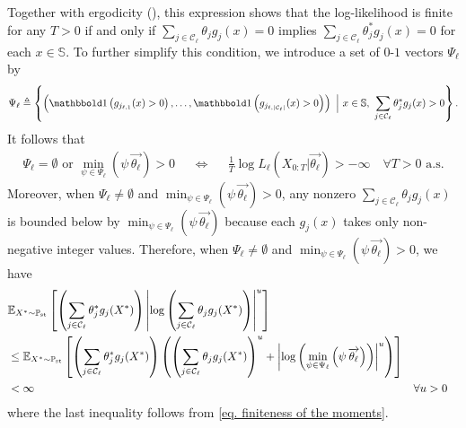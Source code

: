 \documentclass[pdflatex,sn-mathphys-num]{sn-jnl}%
\theoremstyle{thmstyleone}%
\theoremstyle{thmstyletwo}%
\theoremstyle{thmstylethree}%
\begin{document}
\begin{appendices}
Together with ergodicity (), this expression shows that the log-likelihood is finite for any $T>0$ if and only if $\sum_{j\in\mathcal C_\ell} \theta_j g_j(x)=0$ implies $\sum_{j\in\mathcal C_\ell} \theta^*_j g_j(x)=0$ for each $x\in \mathbb S$.
To further simplify this condition, we introduce a set of $0$-$1$ vectors $\Psi_\ell$ by 
\begin{align*}
    \Psi_\ell \triangleq \left\{ \left(\mathbbold 1\left(g_{j_{\ell,1}}(x) > 0\right), \dots, \mathbbold 1\left(g_{j_{\ell,|\mathcal C_\ell|}}(x) > 0\right)\right) ~\Big|~ x\in\mathbb S,\ \sum_{j\in\mathcal C_\ell}\theta^*_j g_j(x)>0\right\}.
\end{align*}
It follows that %
\begin{align}\label{eq condition for finite log likelihood}
    \text{$\Psi_\ell =\emptyset$ or $\min_{\psi\in\Psi_\ell} \left(\psi \, \overrightarrow{\theta_\ell}\right) > 0$} && \Longleftrightarrow &&
    \frac{1}{T} \log L_\ell\left(X_{0:T}\big|\overrightarrow{\theta_\ell}\right)> -\infty \quad \forall T>0 \text{~a.s}.
\end{align}
Moreover, when $\Psi_\ell \neq \emptyset$ and $\min_{\psi\in\Psi_\ell} \left(\psi \, \overrightarrow{\theta_\ell}\right) > 0$, any nonzero $\sum_{j\in\mathcal C_\ell} \theta_j g_j(x)$ is bounded below by $\min_{\psi\in\Psi_\ell} \left(\psi \, \overrightarrow{\theta_\ell}\right)$ because each $g_j(x)$ takes only non-negative integer values. 
Therefore, when $\Psi_\ell \neq \emptyset$ and $\min_{\psi\in\Psi_\ell} \left(\psi \, \overrightarrow{\theta_\ell}\right) > 0$,
we have 
\begin{align}\label{eq the finite expectation for the lambda x log lambda}
        &\mathbb E_{X^* \sim \mathbb P_\text{st}}\left[
        \left(\sum_{j\in\mathcal C_\ell}\theta^*_j g_j(X^*)\right)
        \left|\log\left(\sum_{j\in\mathcal C_\ell} \theta_j g_j(X^*)\right) \right|^u
        \right]\\
        &\leq
        \mathbb E_{X^* \sim \mathbb P_\text{st}}\left[
        \left(\sum_{j\in\mathcal C_\ell}\theta^*_j g_j(X^*)\right)
        \left(
        \left(\sum_{j\in\mathcal C_\ell} \theta_j g_j(X^*)\right)^u
        + \left|\log \left(\min_{\psi\in\Psi_\ell} \left(\psi \, \overrightarrow{\theta_\ell}\right)\right)\right|^u
        \right)
        \right]
        \notag\\
        & < \infty && \forall u >0
        \notag
\end{align}
where the last inequality follows from \eqref{eq. finiteness of the moments}.



\end{appendices}
\end{document}
